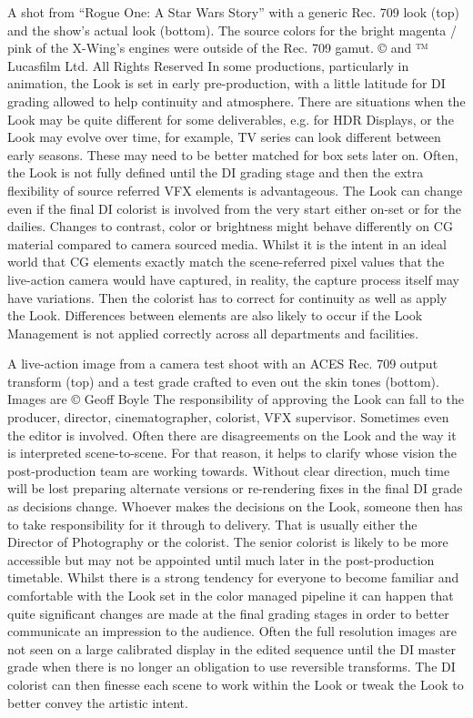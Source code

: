 A shot from “Rogue One: A Star Wars Story” with a generic Rec. 709 look (top) and the show’s actual look (bottom). The source colors for the bright magenta / pink of the X-Wing’s engines were outside of the Rec. 709 gamut.
© and ™ Lucasfilm Ltd. All Rights Reserved
In some productions, particularly in animation, the Look is set in early pre-production, with a little latitude for DI grading allowed to help continuity and atmosphere. There are situations when the Look may be quite different for some deliverables, e.g. for HDR Displays, or the Look may evolve over time, for example, TV series can look different between early seasons. These may need to be better matched for box sets later on. Often, the Look is not fully defined until the DI grading stage and then the extra flexibility of source referred VFX elements is advantageous. The Look can change even if the final DI colorist is involved from the very start either on-set or for the dailies. Changes to contrast, color or brightness might behave differently on CG material compared to camera sourced media. Whilst it is the intent in an ideal world that CG elements exactly match the scene-referred pixel values that the live-action camera would have captured, in reality, the capture process itself may have variations. Then the colorist has to correct for continuity as well as apply the Look. Differences between elements are also likely to occur if the Look Management is not applied correctly across all departments and facilities.



 A live-action image from a camera test shoot with an ACES Rec. 709 output transform (top) and a test grade crafted to even out the skin tones (bottom).
Images are © Geoff Boyle
The responsibility of approving the Look can fall to the producer, director, cinematographer, colorist, VFX supervisor. Sometimes even the editor is involved. Often there are disagreements on the Look and the way it is interpreted scene-to-scene. For that reason, it helps to clarify whose vision the post-production team are working towards. Without clear direction, much time will be lost preparing alternate versions or re-rendering fixes in the final DI grade as decisions change. Whoever makes the decisions on the Look, someone then has to take responsibility for it through to delivery. That is usually either the Director of Photography or the colorist. The senior colorist is likely to be more accessible but may not be appointed until much later in the post-production timetable. Whilst there is a strong tendency for everyone to become familiar and comfortable with the Look set in the color managed pipeline it can happen that quite significant changes are made at the final grading stages in order to better communicate an impression to the audience.  Often the full resolution images are not seen on a large calibrated display in the edited sequence until the DI master grade when there is no longer an obligation to use reversible transforms. The DI colorist  can then finesse each scene to work within the Look or tweak the Look to better convey the artistic intent.


